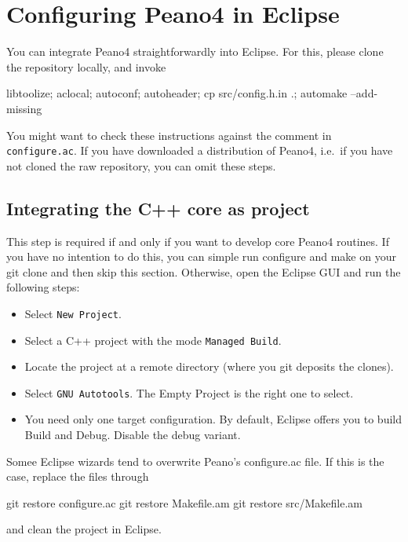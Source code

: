 \chapter{Configuring Peano4 in Eclipse}


You can integrate Peano4 straightforwardly into Eclipse. For this, please clone
the repository locally, and invoke

\begin{code}
libtoolize; aclocal; 
autoconf; autoheader; 
cp src/config.h.in .; 
automake --add-missing
\end{code}

\noindent
You might want to check these instructions against the comment in
\texttt{configure.ac}. If you have downloaded a distribution of Peano4,
i.e.~if you have not cloned the raw repository, you can omit these steps.


\section{Integrating the C++ core as project}

This step is required if and only if you want to develop core Peano4 routines.
If you have no intention to do this, you can simple run configure and make on
your git clone and then skip this section. 
Otherwise, open the Eclipse GUI and run the following steps:

\begin{itemize}
  \item Select \texttt{New Project}.
  \item Select a C++ project with the mode \texttt{Managed Build}.
  \item Locate the project at a remote directory (where you git deposits the
  clones).
  \item Select \texttt{GNU Autotools}. The Empty Project is the right one to select.
  \item You need only one target configuration. By default, Eclipse offers you to build Build and Debug. Disable the debug variant.  
\end{itemize}

\noindent
Somee Eclipse wizards tend to overwrite Peano's configure.ac file. If this is the 
case, replace the files through

\begin{code}
git restore  configure.ac
git restore  Makefile.am
git restore  src/Makefile.am
\end{code}

\noindent
and clean the project in Eclipse.




